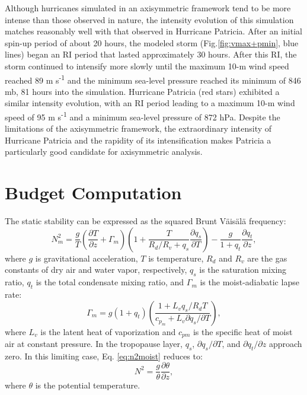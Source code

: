 \documentclass{ametsoc}
\begin{document}
Although hurricanes simulated in an axisymmetric framework tend to be more intense than those observed in nature, the intensity evolution of this simulation matches reasonably well with that observed in Hurricane Patricia.
After an initial spin-up period of about 20 hours, the modeled storm (Fig.\ref{fig:vmax+pmin}, blue lines) began an RI period that lasted approximately 30 hours.
After this RI, the storm continued to intensify more slowly until the maximum 10-m wind speed reached 89 m s\textsuperscript{-1} and the minimum sea-level pressure reached its minimum of 846 mb, 81 hours into the simulation.
Hurricane Patricia (red stars) exhibited a similar intensity evolution, with an RI period leading to a maximum 10-m wind speed of 95 m s\textsuperscript{-1} and a minimum sea-level pressure of 872 hPa.
Despite the limitations of the axisymmetric framework, the extraordinary intensity of Hurricane Patricia and the rapidity of its intensification makes Patricia a particularly good candidate for axisymmetric analysis.

 \section{Budget Computation}

The static stability can be expressed as the squared Brunt V{\"a}is{\"a}l{\"a} frequency:
   \begin{equation} \label{eq:n2moist}
   N_m^2 = \frac{g}{T}\left(\frac{\partial T}{\partial z}+\Gamma_m\right)\left(1+\frac{T}{R_d/R_v+q_s}\frac{\partial q_s}{\partial T}\right)-\frac{g}{1+q_t}\frac{\partial q_t}{\partial z},
   \end{equation}
where $g$ is gravitational acceleration, $T$ is temperature, $R_d$ and $R_v$ are the gas constants of dry air and water vapor, respectively, $q_s$ is the saturation mixing ratio, $q_t$ is the total condensate mixing ratio, and $\Gamma_m$ is the moist-adiabatic lapse rate:
   \begin{equation} \label{eq:gamma_m}
   \Gamma_m = g(1+q_t)\left(\frac{1+L_vq_s/R_dT}{c_p_m +L_v\partial q_s/\partial T}\right),
   \end {equation}
where $L_v$ is the latent heat of vaporization and $c_{pm}$ is the specific heat of moist air at constant pressure.
In the tropopause layer, $q_s$, ${\partial q_s}/{\partial T}$, and ${\partial q_t}/{\partial z}$ approach zero. In this limiting case, Eq. \ref{eq:n2moist} reduces to:
   \begin{equation} \label{eq:n2dry}
   N^2 = \frac{g}{\theta}\frac{\partial \theta}{\partial z},
   \end{equation}
where $\theta$ is the potential temperature.
\end{document}
